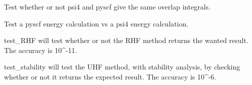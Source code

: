 \documentclass[letterpaper,10pt,english]{sphinxmanual}
\begin{document}
\begin{fulllineitems}
\label{\detokenize{tests:hf.tests.test_auth.test_overlap}}
Test whether or not psi4 and pyscf give the same overlap integrals.

\end{fulllineitems}


\begin{fulllineitems}
\label{\detokenize{tests:hf.tests.test_auth.test_pyscf_vs_psi4}}
Test a pyscf energy calculation vs a psi4 energy calculation.

\end{fulllineitems}


\begin{fulllineitems}
\label{\detokenize{tests:hf.tests.test_auth.test_rhf}}
test\_RHF will test whether or not the RHF method returns the wanted result. The accuracy is 10\textasciicircum{}-11.

\end{fulllineitems}


\begin{fulllineitems}
\label{\detokenize{tests:hf.tests.test_auth.test_stability}}
test\_stability will test the UHF method, with stability analysis, by checking whether or not it returns
the expected result. The accuracy is 10\textasciicircum{}-6.

\end{fulllineitems}

\end{document}
